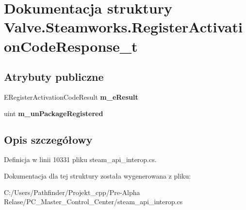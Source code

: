 \hypertarget{struct_valve_1_1_steamworks_1_1_register_activation_code_response__t}{}\section{Dokumentacja struktury Valve.\+Steamworks.\+Register\+Activation\+Code\+Response\+\_\+t}
\label{struct_valve_1_1_steamworks_1_1_register_activation_code_response__t}
\subsection*{Atrybuty publiczne}
\begin{DoxyCompactItemize}
\item 
\mbox{\label{struct_valve_1_1_steamworks_1_1_register_activation_code_response__t_aecb1067feb1826e2774cb911925ba728}} 
E\+Register\+Activation\+Code\+Result {\bfseries m\+\_\+e\+Result}
\item 
\mbox{\label{struct_valve_1_1_steamworks_1_1_register_activation_code_response__t_acf9d5729df72902f96e819f0543d5b57}} 
uint {\bfseries m\+\_\+un\+Package\+Registered}
\end{DoxyCompactItemize}


\subsection{Opis szczegółowy}


Definicja w linii 10331 pliku steam\+\_\+api\+\_\+interop.\+cs.



Dokumentacja dla tej struktury została wygenerowana z pliku\+:\begin{DoxyCompactItemize}
\item 
C\+:/\+Users/\+Pathfinder/\+Projekt\+\_\+cpp/\+Pre-\/\+Alpha Relase/\+P\+C\+\_\+\+Master\+\_\+\+Control\+\_\+\+Center/steam\+\_\+api\+\_\+interop.\+cs\end{DoxyCompactItemize}
